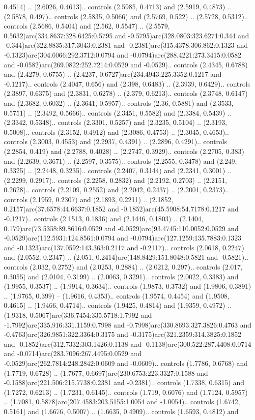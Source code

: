 0.4514) .. (2.6026, 0.4613).. controls (2.5985, 0.4713) and (2.5919, 0.4873) .. (2.5878, 0.497).. controls (2.5835, 0.5066) and (2.5769, 0.522) .. (2.5728, 0.5312).. controls (2.5686, 0.5404) and (2.562, 0.5547) .. (2.5579, 0.5632)arc(334.8637:328.6425:0.5795 and -0.5795)arc(328.0803:323.6271:0.344 and -0.344)arc(322.8835:317.3043:0.2381 and -0.2381)arc(315.4378:306.862:0.1323 and -0.1323)arc(304.6066:292.3712:0.0794 and -0.0794)arc(288.4221:273.3415:0.0582 and -0.0582)arc(269.0822:252.7214:0.0529 and -0.0529).. controls (2.4345, 0.6788) and (2.4279, 0.6755) .. (2.4237, 0.6727)arc(234.4943:225.3352:0.1217 and -0.1217).. controls (2.4047, 0.656) and (2.398, 0.6483) .. (2.3939, 0.6429).. controls (2.3897, 0.6375) and (2.3831, 0.6278) .. (2.379, 0.6213).. controls (2.3748, 0.6147) and (2.3682, 0.6032) .. (2.3641, 0.5957).. controls (2.36, 0.5881) and (2.3533, 0.5751) .. (2.3492, 0.5666).. controls (2.3451, 0.5582) and (2.3384, 0.5439) .. (2.3342, 0.5348).. controls (2.3301, 0.5257) and (2.3235, 0.5104) .. (2.3193, 0.5008).. controls (2.3152, 0.4912) and (2.3086, 0.4753) .. (2.3045, 0.4653).. controls (2.3003, 0.4553) and (2.2937, 0.4391) .. (2.2896, 0.4291).. controls (2.2854, 0.419) and (2.2788, 0.4028) .. (2.2747, 0.3929).. controls (2.2705, 0.383) and (2.2639, 0.3671) .. (2.2597, 0.3575).. controls (2.2555, 0.3478) and (2.249, 0.3325) .. (2.2448, 0.3235).. controls (2.2407, 0.3144) and (2.2341, 0.3001) .. (2.2299, 0.2917).. controls (2.2258, 0.2832) and (2.2192, 0.2703) .. (2.2151, 0.2628).. controls (2.2109, 0.2552) and (2.2042, 0.2437) .. (2.2001, 0.2373).. controls (2.1959, 0.2307) and (2.1893, 0.2211) .. (2.1852, 0.2157)arc(37.6578:44.6637:0.1852 and -0.1852)arc(45.5908:54.7178:0.1217 and -0.1217).. controls (2.1513, 0.1836) and (2.1446, 0.1803) .. (2.1404, 0.179)arc(73.5358:89.8616:0.0529 and -0.0529)arc(93.4745:110.0052:0.0529 and -0.0529)arc(112.5931:124.8561:0.0794 and -0.0794)arc(127.1259:135.7883:0.1323 and -0.1323)arc(137.0592:143.363:0.2117 and -0.2117).. controls (2.0618, 0.2247) and (2.0552, 0.2347) .. (2.051, 0.2414)arc(148.8429:151.8048:0.5821 and -0.5821).. controls (2.032, 0.2752) and (2.0253, 0.2884) .. (2.0212, 0.297).. controls (2.017, 0.3055) and (2.0104, 0.3199) .. (2.0063, 0.3291).. controls (2.0022, 0.3383) and (1.9955, 0.3537) .. (1.9914, 0.3634).. controls (1.9873, 0.3732) and (1.9806, 0.3891) .. (1.9765, 0.399) -- (1.9616, 0.4353).. controls (1.9574, 0.4454) and (1.9508, 0.4615) .. (1.9466, 0.4714).. controls (1.9425, 0.4814) and (1.9359, 0.4972) .. (1.9318, 0.5067)arc(336.7454:335.5718:1.7992 and -1.7992)arc(335.916:331.1159:0.7998 and -0.7998)arc(330.8693:327.3826:0.4763 and -0.4763)arc(326.9851:322.3364:0.3175 and -0.3175)arc(321.2359:314.3825:0.1852 and -0.1852)arc(312.7332:303.1426:0.1138 and -0.1138)arc(300.522:287.4408:0.0714 and -0.0714)arc(283.7096:267.4495:0.0529 and -0.0529)arc(262.7814:248.2842:0.0609 and -0.0609).. controls (1.7786, 0.6768) and (1.7719, 0.6728) .. (1.7677, 0.6697)arc(230.6753:223.3327:0.1588 and -0.1588)arc(221.506:215.7738:0.2381 and -0.2381).. controls (1.7338, 0.6315) and (1.7272, 0.6213) .. (1.7231, 0.6145).. controls (1.719, 0.6076) and (1.7124, 0.5957) .. (1.7081, 0.5878)arc(207.4583:203.5155:1.0054 and -1.0054).. controls (1.6742, 0.5161) and (1.6676, 0.5007) .. (1.6635, 0.4909).. controls (1.6593, 0.4812) and 